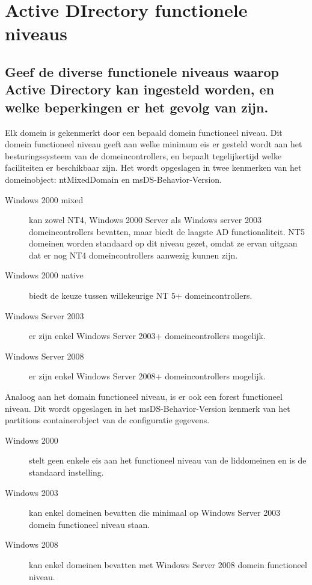 \chapter{Active DIrectory functionele niveaus}

\section{Geef de diverse functionele niveaus waarop Active Directory kan
ingesteld worden, en welke beperkingen er het gevolg van zijn.}

Elk domein is gekenmerkt door een bepaald domein functioneel niveau. Dit domein
functioneel niveau geeft aan welke minimum eis er gesteld wordt aan het
besturingssysteem van de domeincontrollers, en bepaalt tegelijkertijd welke
faciliteiten er beschikbaar zijn. Het wordt opgeslagen in twee kenmerken van het
domeinobject: ntMixedDomain en msDS-Behavior-Version.
\begin{description}
	\item[Windows 2000 mixed] kan zowel NT4, Windows 2000 Server als Windows
		server 2003 domeincontrollers bevatten, maar biedt de laagste AD
		functionaliteit. NT5 domeinen worden standaard op dit niveau
		gezet, omdat ze ervan uitgaan dat er nog NT4 domeincontrollers
		aanwezig kunnen zijn.
	\item[Windows 2000 native] biedt de keuze tussen willekeurige NT 5+
		domeincontrollers.
	\item[Windows Server 2003] er zijn enkel Windows Server 2003+
		domeincontrollers mogelijk.
	\item[Windows Server 2008] er zijn enkel Windows Server 2008+
		domeincontrollers mogelijk.
\end{description}

Analoog aan het domain functioneel niveau, is er ook een forest functioneel
niveau. Dit wordt opgeslagen in het msDS-Behavior-Version kenmerk van het
partitions containerobject van de configuratie gegevens.
\begin{description}
	\item[Windows 2000] stelt geen enkele eis aan het functioneel niveau van
		de liddomeinen en is de standaard instelling.
	\item[Windows 2003] kan enkel domeinen bevatten die minimaal op Windows
		Server 2003 domein functioneel niveau staan.
	\item[Windows 2008] kan enkel domeinen bevatten met Windows Server 2008
		domein functioneel niveau.
\end{description}

